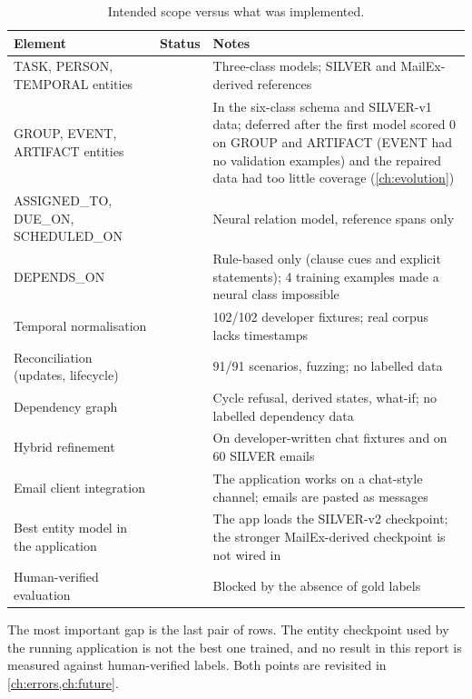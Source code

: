 \begin{table}[h]
\centering
\caption{Intended scope versus what was implemented.}
\label{tab:scope}
\footnotesize
\begin{tabularx}{\linewidth}{@{}p{36mm}p{22mm}L@{}}
\toprule
Element & Status & Notes \\
\midrule
TASK, PERSON, TEMPORAL entities &  & Three-class models; SILVER and MailEx-derived references \\
GROUP, EVENT, ARTIFACT entities &  & In the six-class schema and SILVER-v1 data; deferred after the first model scored 0 on GROUP and ARTIFACT (EVENT had no validation examples) and the repaired data had too little coverage (\cref{ch:evolution}) \\
ASSIGNED\_TO, DUE\_ON, SCHEDULED\_ON &  & Neural relation model, reference spans only \\
DEPENDS\_ON &  & Rule-based only (clause cues and explicit statements); 4 training examples made a neural class impossible \\
Temporal normalisation &  & 102/102 developer fixtures; real corpus lacks timestamps \\
Reconciliation (updates, lifecycle) &  & 91/91 scenarios, fuzzing; no labelled data \\
Dependency graph &  & Cycle refusal, derived states, what-if; no labelled dependency data \\
Hybrid refinement &  & On developer-written chat fixtures and on 60 SILVER emails \\
Email client integration &  & The application works on a chat-style channel; emails are pasted as messages \\
Best entity model in the application &  & The app loads the SILVER-v2 checkpoint; the stronger MailEx-derived checkpoint is not wired in \\
Human-verified evaluation &  & Blocked by the absence of gold labels \\
\bottomrule
\end{tabularx}
\end{table}

The most important gap is the last pair of rows. The entity checkpoint used by the running application is not the best one trained, and no result in this report is measured against human-verified labels. Both points are revisited in \cref{ch:errors,ch:future}.
